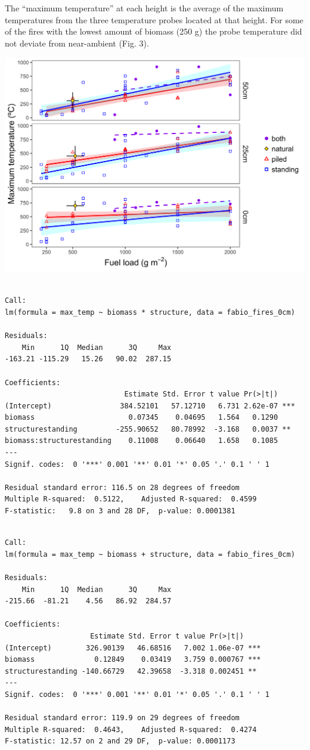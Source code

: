 \documentclass[11pt,a4paper]{article}
\begin{document}
The ``maximum temperature'' at each height is the average of the maximum
temperatures from the three temperature probes located at that height.
For some of the fires with the lowest amount of biomass (250 g) the
probe temperature did not deviate from near-ambient (Fig. 3).

\includegraphics{figures/maxtemp-figure-1.png}

\begin{verbatim}

Call:
lm(formula = max_temp ~ biomass * structure, data = fabio_fires_0cm)

Residuals:
    Min      1Q  Median      3Q     Max 
-163.21 -115.29   15.26   90.02  287.15 

Coefficients:
                            Estimate Std. Error t value Pr(>|t|)    
(Intercept)                384.52101   57.12710   6.731 2.62e-07 ***
biomass                      0.07345    0.04695   1.564   0.1290    
structurestanding         -255.90652   80.78992  -3.168   0.0037 ** 
biomass:structurestanding    0.11008    0.06640   1.658   0.1085    
---
Signif. codes:  0 '***' 0.001 '**' 0.01 '*' 0.05 '.' 0.1 ' ' 1

Residual standard error: 116.5 on 28 degrees of freedom
Multiple R-squared:  0.5122,    Adjusted R-squared:  0.4599 
F-statistic:   9.8 on 3 and 28 DF,  p-value: 0.0001381
\end{verbatim}

\begin{verbatim}

Call:
lm(formula = max_temp ~ biomass + structure, data = fabio_fires_0cm)

Residuals:
    Min      1Q  Median      3Q     Max 
-215.66  -81.21    4.56   86.92  284.57 

Coefficients:
                    Estimate Std. Error t value Pr(>|t|)    
(Intercept)        326.90139   46.68516   7.002 1.06e-07 ***
biomass              0.12849    0.03419   3.759 0.000767 ***
structurestanding -140.66729   42.39658  -3.318 0.002451 ** 
---
Signif. codes:  0 '***' 0.001 '**' 0.01 '*' 0.05 '.' 0.1 ' ' 1

Residual standard error: 119.9 on 29 degrees of freedom
Multiple R-squared:  0.4643,    Adjusted R-squared:  0.4274 
F-statistic: 12.57 on 2 and 29 DF,  p-value: 0.0001173
\end{verbatim}
\end{document}
